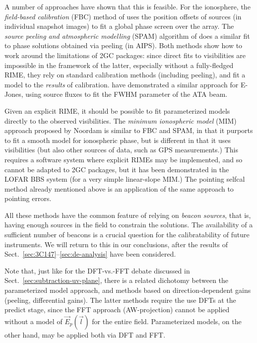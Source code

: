 \documentclass[]{aa}
\newcommand{\jones}[2]{\vec {#1}_{#2}}
\begin{document}
A number of approaches have shown that this is feasible. For the ionosphere, the \emph{field-based calibration} (FBC) method of \citet{Cotton:FBC} uses the position offsets of sources (in individual snapshot images) to fit a global phase screen over the array. The \emph{source peeling and atmospheric modelling} (SPAM) algorithm of \citet{Intema:SPAM} does a similar fit to phase solutions obtained via peeling (in AIPS). Both methods show how to work around the limitations of 2GC packages: since direct fits to visibilities are impossible in the framework of the latter, especially without a fully-fledged RIME, they rely on standard calibration methods (including peeling), and fit a model to the \emph{results} of calibration. \citet{Hull:ata-beam-fitting} have demonstrated a similar approach for E-Jones, using source fluxes to fit the FWHM parameter of the ATA beam. 

Given an explicit RIME, it should be possible to fit parameterized models directly to the observed visibilities. The \emph{minimum ionospheric model} (MIM) approach proposed by Noordam is similar to FBC and SPAM, in that it purports to fit a smooth model for ionospheric phase, but is different in that it uses visibilities (but also other sources of data, such as GPS measurements.) This requires a software system where explicit RIMEs may be implemented, and so cannot be adapted to 2GC packages, but it has been demonstrated in the LOFAR BBS system (for a very simple linear-slope MIM.) The pointing selfcal method \citep{SB:pointing} already mentioned above is an application of the same approach to pointing errors.

All these methods have the common feature of relying on \emph{beacon sources}, that is, having enough sources in the field to constrain the solutions. The availability of a sufficient number of beacons is a crucial question for the calibratability of future instruments. We will return to this in our conclusions, after the results of Sect.~\ref{sec:3C147}--\ref{sec:de-analysis} have been considered.

Note that, just like for the DFT-vs.-FFT debate discussed in Sect.~\ref{sec:subtraction-uv-plane}, there is a related dichotomy between the parameterized model approach, and methods based on direction-dependent gains (peeling, differential gains). The latter methods require the use DFTs at the predict stage, since the FFT approach (AW-projection) cannot be applied without a model of $\jones{E}{p}(\vec l)$ for the entire field. Parameterized models, on the other hand, may be applied both via DFT and FFT. 
\end{document}
